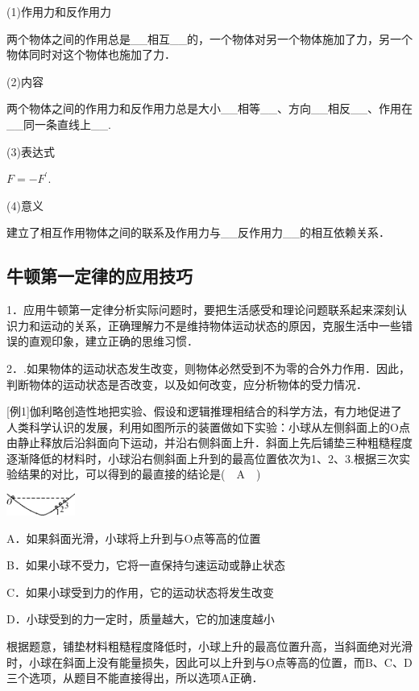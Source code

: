 \documentclass[cn,10.5pt,chinese,mac,chinesefont=founder]{elegantbook}
\begin{document}
(1)作用力和反作用力

两个物体之间的作用总是\_\_相互\_\_的，一个物体对另一个物体施加了力，另一个物体同时对这个物体也施加了力．

(2)内容

两个物体之间的作用力和反作用力总是大小\_\_相等\_\_、方向\_\_相反\_\_、作用在\_\_同一条直线上\_\_.

(3)表达式

$F=-F^{\prime}$.

(4)意义

建立了相互作用物体之间的联系及作用力与\_\_反作用力\_\_的相互依赖关系．

\newpage
\subsection{牛顿第一定律的应用技巧}

1．应用牛顿第一定律分析实际问题时，要把生活感受和理论问题联系起来深刻认识力和运动的关系，正确理解力不是维持物体运动状态的原因，克服生活中一些错误的直观印象，建立正确的思维习惯．

2．.如果物体的运动状态发生改变，则物体必然受到不为零的合外力作用．因此，判断物体的运动状态是否改变，以及如何改变，应分析物体的受力情况．

{[}例1{]}伽利略创造性地把实验、假设和逻辑推理相结合的科学方法，有力地促进了人类科学认识的发展，利用如图所示的装置做如下实验：小球从左侧斜面上的O点由静止释放后沿斜面向下运动，并沿右侧斜面上升．斜面上先后铺垫三种粗糙程度逐渐降低的材料时，小球沿右侧斜面上升到的最高位置依次为1、2、3.根据三次实验结果的对比，可以得到的最直接的结论是(　A　)

\begin{center}\includegraphics[width=0.88542in,height=0.28125in]{media/image95.png}\end{center}

A．如果斜面光滑，小球将上升到与O点等高的位置

B．如果小球不受力，它将一直保持匀速运动或静止状态

C．如果小球受到力的作用，它的运动状态将发生改变

D．小球受到的力一定时，质量越大，它的加速度越小
\begin{solution}
	根据题意，铺垫材料粗糙程度降低时，小球上升的最高位置升高，当斜面绝对光滑时，小球在斜面上没有能量损失，因此可以上升到与O点等高的位置，而B、C、D三个选项，从题目不能直接得出，所以选项A正确．
\end{solution}
\end{document}
